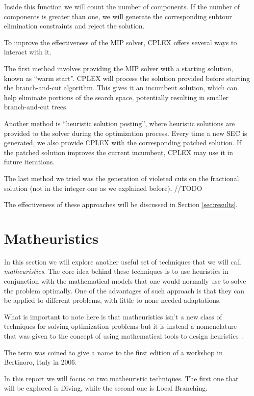 \documentclass{article}
\begin{document}
Inside this function we will count the number of components. If the number of
components is greater than one, we will generate the corresponding subtour
elimination constraints and reject the solution.

To improve the effectiveness of the MIP solver, CPLEX offers several
ways to interact with it.

The first method involves providing the MIP solver with a starting solution, known as ``warm start''.
CPLEX will process the solution provided before starting the branch-and-cut algorithm. 
This gives it an incumbent solution, which can help eliminate portions
of the search space, potentially resulting in smaller branch-and-cut trees.

Another method is ``heuristic solution posting'', where heuristic solutions are provided to the solver
during the optimization process. Every time a new SEC is generated, we also provide CPLEX with
the corresponding patched solution. If the patched solution improves the current incumbent, CPLEX
may use it in future iterations.

The last method we tried was the generation of violeted cuts on the fractional solution
(not in the integer one as we explained before). //TODO

The effectiveness of these approaches will be discussed in Section \ref{sec:results}.
\newpage

\section{Matheuristics}
In this section we will explore another useful set of techniques that we will call
\textit{matheuristics}.
The core idea behind these techniques is to use heuristics in conjunction with the
mathematical models that one would normally use to solve the problem optimally.
One of the advantages of such approach is that they can be applied to different problems,
with little to none needed adaptations.

What is important to note here is that matheuristics isn't a new class of techniques
for solving optimization problems but it is instead a nomenclature that was given
to the concept of using mathematical tools to design heuristics~\cite{boschetti2022matheuristics}.

The term was coined to give a name to the first edition of a workshop in Bertinoro, Italy
in 2006.

In this report we will focus on two matheuristic techniques.
The first one that will be explored is Diving, while the second one is Local Branching.
\end{document}

